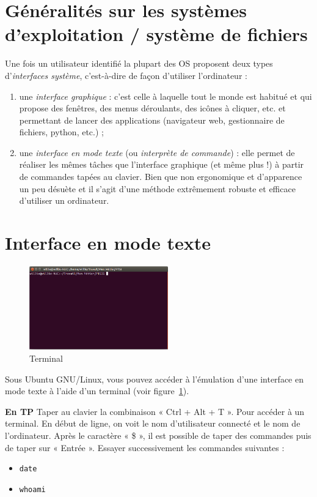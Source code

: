 \section{Généralités sur les systèmes d'exploitation / système de fichiers}

Une fois un utilisateur identifié la plupart des OS proposent deux types d'\textit{interfaces système}, c'est-à-dire de façon d'utiliser l'ordinateur :
\begin{enumerate}
 \item une \textit{interface graphique} : c'est celle à laquelle tout le monde est habitué et qui propose des fenêtres, des menus déroulants, des icônes à cliquer, etc. et permettant de lancer des applications (navigateur web, gestionnaire de fichiers, python, etc.) ;
 \item une \textit{interface en mode texte} (ou \textit{interprète de commande}) : elle permet de réaliser les mêmes tâches que l'interface graphique (et même plus !) à partir de commandes tapées au clavier. Bien que non ergonomique et d'apparence un peu désuète et  il s'agit d'une méthode extrêmement robuste et efficace d'utiliser un ordinateur.
\end{enumerate}

\newpage
\section{Interface en mode texte}

\begin{figure}[htp]
 \centering
 \includegraphics[width=6cm]{img/terminal}
 \caption{Terminal}
 \label{fig:terminal}
\end{figure}

Sous Ubuntu GNU/Linux, vous pouvez accéder à l'émulation d'une interface en mode texte à l'aide d'un terminal (voir figure~\ref{fig:terminal}). 

\textbf{En TP} Taper au clavier la combinaison « Ctrl + Alt + T ». Pour accéder à un terminal. En début de ligne, on voit le nom d'utilisateur connecté et le nom de l'ordinateur. Après le caractère « \$ », il est possible de taper des commandes puis de taper sur « Entrée ». Essayer successivement les commandes suivantes :
\begin{itemize}
 \item[] \texttt{date}
 \item[] \texttt{whoami}
\end{itemize}

